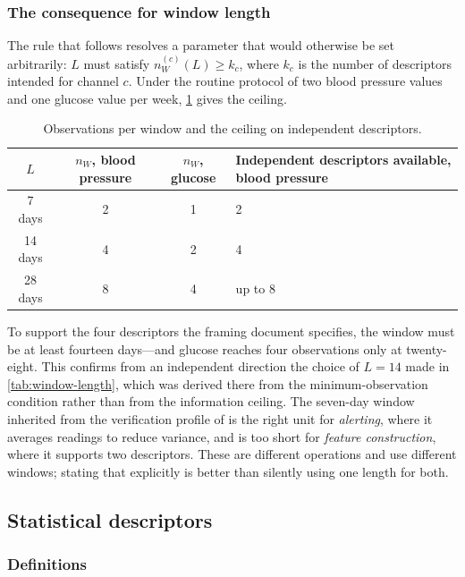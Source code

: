 \documentclass[12pt,a4paper,oneside]{report}
\begin{document}
\subsubsection{The consequence for window length}

The rule that follows resolves a parameter that would otherwise be set arbitrarily: $L$ must satisfy $n_W^{(c)}(L) \geq k_c$, where $k_c$ is the number of descriptors intended for channel $c$. Under the routine protocol of two blood pressure values and one glucose value per week, \cref{tab:ceiling} gives the ceiling.

\begin{table}[htbp]
\centering\small
\caption{Observations per window and the ceiling on independent descriptors.}\label{tab:ceiling}
\begin{tabularx}{\textwidth}{@{}c c c X@{}}
\toprule
\textbf{$L$} & \textbf{$n_W$, blood pressure} & \textbf{$n_W$, glucose} & \textbf{Independent descriptors available, blood pressure} \\
\midrule
7 days & 2 & 1 & 2 \\
14 days & 4 & 2 & 4 \\
28 days & 8 & 4 & up to 8 \\
\bottomrule
\end{tabularx}
\end{table}

To support the four descriptors the framing document specifies, the window must be at least fourteen days---and glucose reaches four observations only at twenty-eight. This confirms from an independent direction the choice of $L = 14$ made in \cref{tab:window-length}, which was derived there from the minimum-observation condition rather than from the information ceiling. The seven-day window inherited from the verification profile of \textcite{mihevc2025} is the right unit for \emph{alerting}, where it averages readings to reduce variance, and is too short for \emph{feature construction}, where it supports two descriptors. These are different operations and use different windows; stating that explicitly is better than silently using one length for both.

\subsection{Statistical descriptors}\label{sec:descriptors}

\subsubsection{Definitions}
\end{document}
